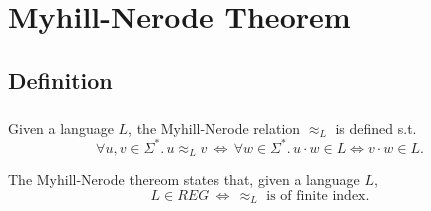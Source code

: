 \documentclass[11pt,a4paper,oneside]{book}
\begin{document}

                        



            \paragraph{} 


            

        \chapter{Myhill-Nerode Theorem}

            \section{Definition}

                \paragraph{} Given a language $L$, the Myhill-Nerode relation $\approx_L$ is defined s.t. 
                \[
                    \forall u, v \in \Sigma^*. \,
                    u \approx_L v \, \Longleftrightarrow \, 
                    \forall w \in \Sigma^*.\, u \cdot w \in L \Leftrightarrow v \cdot w \in L.
                \]


                The Myhill-Nerode thereom states that, given a language $L$,
                \[
                    L \in REG \, \Longleftrightarrow \, \approx_L \mbox{ is of finite index.}
                \]
\end{document}
